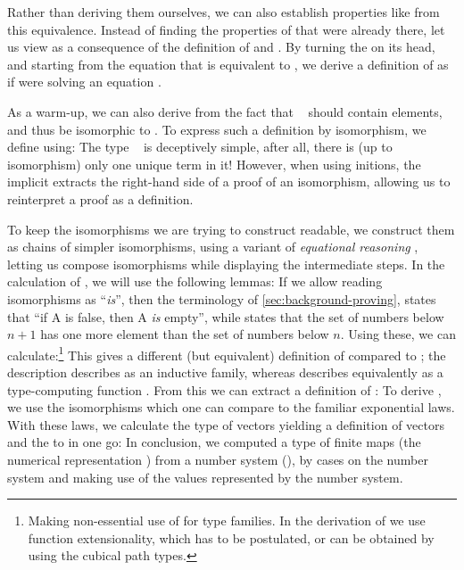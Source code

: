Rather than deriving them ourselves, we can also establish properties like  from this equivalence. Instead of finding the properties of  that were already there, let us view  as a consequence of the definition of \bN{} and . By turning the  on its head, and starting from the equation that  is equivalent to , we derive a definition of  as if were solving an equation \cite{calcdata}.

As a warm-up, we can also derive  from the fact that \  should contain  elements, and thus be isomorphic to . To express such a definition by isomorphism, we define
using:
The type \  is deceptively simple, after all, there is (up to isomorphism) only one unique term in it! However, when using initions, the implicit  extracts the right-hand side of a proof of an isomorphism, allowing us to reinterpret a proof as a definition.

To keep the isomorphisms we are trying to construct readable, we construct them as chains of simpler isomorphisms, using a variant of \emph{equational reasoning} \cite{agdastdlib, plfa}, letting us compose isomorphisms while displaying the intermediate steps. In the calculation of , we will use the following lemmas:
If we allow reading isomorphisms as ``\emph{is}'', then the terminology of \autoref{sec:background-proving},  states that ``if A is false, then A \emph{is} empty'', while  states that the set of numbers below $n+1$ has one more element than the set of numbers below $n$. Using these, we can calculate:\footnote{Making non-essential use of  for type families. In the derivation of  we use function extensionality, which has to be postulated, or can be obtained by using the cubical path types.}
This gives a different (but equivalent) definition of  compared to ; the description  describes  as an inductive family, whereas  describes  equivalently as a type-computing function \cite{progorn}. From this  we can extract a definition of :
To derive , we use the isomorphisms
which one can compare to the familiar exponential laws. With these laws, we calculate the type of vectors
yielding a definition of vectors and the  to  in one go:
In conclusion, we computed a type of finite maps (the numerical representation ) from a number system (\bN{}), by cases on the number system and making use of the values represented by the number system.


